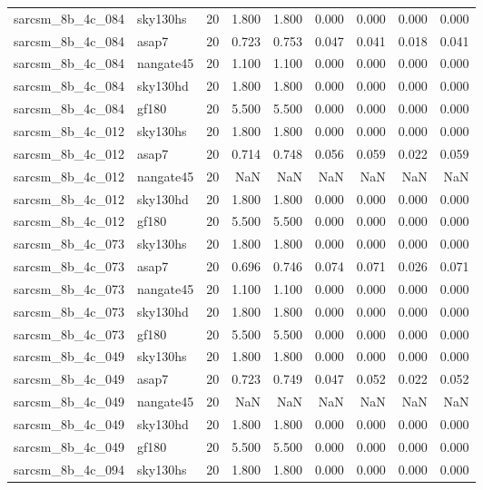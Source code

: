 \begin{tabular}{llrrrrrrr}
sarcsm\_8b\_4c\_084 & sky130hs & 20 & 1.800 & 1.800 & 0.000 & 0.000 & 0.000 & 0.000 \\
sarcsm\_8b\_4c\_084 & asap7 & 20 & 0.723 & 0.753 & 0.047 & 0.041 & 0.018 & 0.041 \\
sarcsm\_8b\_4c\_084 & nangate45 & 20 & 1.100 & 1.100 & 0.000 & 0.000 & 0.000 & 0.000 \\
sarcsm\_8b\_4c\_084 & sky130hd & 20 & 1.800 & 1.800 & 0.000 & 0.000 & 0.000 & 0.000 \\
sarcsm\_8b\_4c\_084 & gf180 & 20 & 5.500 & 5.500 & 0.000 & 0.000 & 0.000 & 0.000 \\
sarcsm\_8b\_4c\_012 & sky130hs & 20 & 1.800 & 1.800 & 0.000 & 0.000 & 0.000 & 0.000 \\
sarcsm\_8b\_4c\_012 & asap7 & 20 & 0.714 & 0.748 & 0.056 & 0.059 & 0.022 & 0.059 \\
sarcsm\_8b\_4c\_012 & nangate45 & 20 & NaN & NaN & NaN & NaN & NaN & NaN \\
sarcsm\_8b\_4c\_012 & sky130hd & 20 & 1.800 & 1.800 & 0.000 & 0.000 & 0.000 & 0.000 \\
sarcsm\_8b\_4c\_012 & gf180 & 20 & 5.500 & 5.500 & 0.000 & 0.000 & 0.000 & 0.000 \\
sarcsm\_8b\_4c\_073 & sky130hs & 20 & 1.800 & 1.800 & 0.000 & 0.000 & 0.000 & 0.000 \\
sarcsm\_8b\_4c\_073 & asap7 & 20 & 0.696 & 0.746 & 0.074 & 0.071 & 0.026 & 0.071 \\
sarcsm\_8b\_4c\_073 & nangate45 & 20 & 1.100 & 1.100 & 0.000 & 0.000 & 0.000 & 0.000 \\
sarcsm\_8b\_4c\_073 & sky130hd & 20 & 1.800 & 1.800 & 0.000 & 0.000 & 0.000 & 0.000 \\
sarcsm\_8b\_4c\_073 & gf180 & 20 & 5.500 & 5.500 & 0.000 & 0.000 & 0.000 & 0.000 \\
sarcsm\_8b\_4c\_049 & sky130hs & 20 & 1.800 & 1.800 & 0.000 & 0.000 & 0.000 & 0.000 \\
sarcsm\_8b\_4c\_049 & asap7 & 20 & 0.723 & 0.749 & 0.047 & 0.052 & 0.022 & 0.052 \\
sarcsm\_8b\_4c\_049 & nangate45 & 20 & NaN & NaN & NaN & NaN & NaN & NaN \\
sarcsm\_8b\_4c\_049 & sky130hd & 20 & 1.800 & 1.800 & 0.000 & 0.000 & 0.000 & 0.000 \\
sarcsm\_8b\_4c\_049 & gf180 & 20 & 5.500 & 5.500 & 0.000 & 0.000 & 0.000 & 0.000 \\
sarcsm\_8b\_4c\_094 & sky130hs & 20 & 1.800 & 1.800 & 0.000 & 0.000 & 0.000 & 0.000 \\

\end{tabular}
